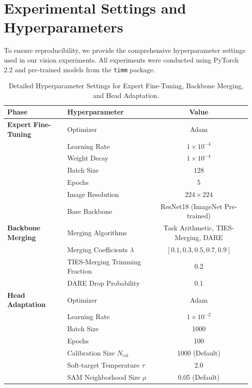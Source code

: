 \documentclass{article}
\theoremstyle{plain}
\theoremstyle{definition}
\theoremstyle{remark}
\begin{document}
\section{Experimental Settings and Hyperparameters}
\label{app:hyperparameters}
To ensure reproducibility, we provide the comprehensive hyperparameter settings used in our vision experiments. All experiments were conducted using PyTorch 2.2 and pre-trained models from the \texttt{timm} package.

\begin{table}[h]
\caption{Detailed Hyperparameter Settings for Expert Fine-Tuning, Backbone Merging, and Head Adaptation.}
\label{tab:app_hyperparameters}
\begin{center}
\begin{small}
\begin{tabular}{llc}
\toprule
Phase & Hyperparameter & Value \\
\midrule
\textbf{Expert Fine-Tuning} & Optimizer & Adam \\
& Learning Rate & $1 \times 10^{-4}$ \\
& Weight Decay & $1 \times 10^{-4}$ \\
& Batch Size & 128 \\
& Epochs & 5 \\
& Image Resolution & $224 \times 224$ \\
& Base Backbone & ResNet18 (ImageNet Pre-trained) \\
\midrule
\textbf{Backbone Merging} & Merging Algorithms & Task Arithmetic, TIES-Merging, DARE \\
& Merging Coefficients $\lambda$ & $[0.1, 0.3, 0.5, 0.7, 0.9]$ \\
& TIES-Merging Trimming Fraction & 0.2 \\
& DARE Drop Probability & 0.1 \\
\midrule
\textbf{Head Adaptation} & Optimizer & Adam \\
& Learning Rate & $1 \times 10^{-2}$ \\
& Batch Size & 1000 \\
& Epochs & 100 \\
& Calibration Size $N_{\text{cal}}$ & 1000 (Default) \\
& Soft-target Temperature $\tau$ & 2.0 \\
& SAM Neighborhood Size $\rho$ & 0.05 (Default) \\
\bottomrule
\end{tabular}
\end{small}
\end{center}
\end{table}
\end{document}
